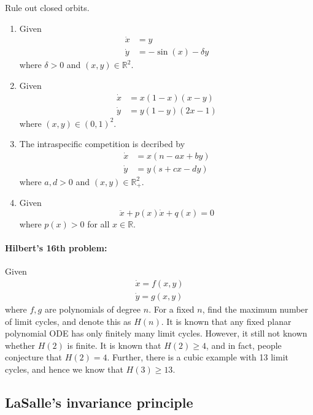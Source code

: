 \documentclass{article}
\newcommand*{\R}{\mathbb{R}}
\begin{document}
\begin{hw}
    Rule out closed orbits.
    \begin{enumerate}
        \item Given
        $$\begin{aligned}
            \dot x &= y\\
            \dot y &= -\sin(x)-\delta y
        \end{aligned}$$
        where $\delta > 0$ and $(x,y)\in\R^2$.

        \item Given
        $$\begin{aligned}
            \dot x &= x(1-x)(x-y)\\
            \dot y &= y(1-y)(2x-1)
        \end{aligned}$$
        where $(x,y) \in (0,1)^2$.

        \item The intraspecific competition is decribed by
        $$\begin{aligned}
            \dot x &= x(n-ax+by)\\
            \dot y &= y(s+cx-dy)
        \end{aligned}$$
        where $a,d > 0$ and $(x,y)\in\R_+^2$.

        \item Given
        $$\ddot x + p(x)\dot x+q(x)=0$$
        where $p(x) > 0$ for all $x \in \R$.
    \end{enumerate}
\end{hw}

\paragraph{Hilbert's 16th problem:}
Given
$$\begin{aligned}
    \dot x = f(x,y)\\
    \dot y = g(x,y)
\end{aligned}$$
where $f,g$ are polynomials of degree $n$. For a fixed $n$, find the maximum number of limit cycles, and denote this as $H(n)$. It is known that any fixed planar polynomial ODE has only finitely many limit cycles. However, it still not known whether $H(2)$ is finite. It is known that $H(2) \geq 4$, and in fact, people conjecture that $H(2)=4$. Further, there is a cubic example with 13 limit cycles, and hence we know that $H(3)\geq 13$.

\subsection{LaSalle's invariance principle}
\end{document}
